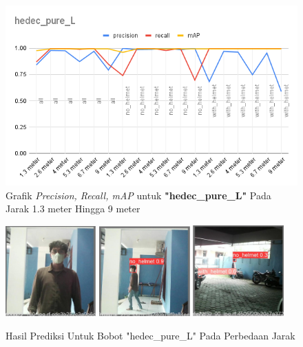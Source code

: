 \begin{enumerate}
  \newpage
  \begin{figure} [h!]
    \centering
    \includegraphics[width=1\textwidth]{gambar/BerdasarkanJarak/hedec_pure_L.png}
    \caption{Grafik \emph{Precision, Recall, mAP} untuk \textbf{"hedec\_pure\_L"} Pada Jarak 1.3 meter Hingga 9 meter}
    \label{fig:grafvaljarak_hedec_pure_L}  
  \end{figure}

  \begin{figure} [h!]
    \centering
    \includegraphics[width=0.31\textwidth]{gambar/BerdasarkanJarak_v2/val_hedec_pure_L/Jarak1_3/val_batch0_pred.jpg}
    \includegraphics[width=0.31\textwidth]{gambar/BerdasarkanJarak_v2/val_hedec_pure_L/Jarak5_3/val_batch0_pred.jpg}
    \includegraphics[width=0.31\textwidth]{gambar/BerdasarkanJarak_v2/val_hedec_pure_L/Jarak9/val_batch0_pred.jpg}
    \caption{Hasil Prediksi Untuk Bobot "hedec\_pure\_L" Pada Perbedaan Jarak}
    \label{fig:valjarak_sample_hedec_pure_L}  
  \end{figure}



\end{enumerate}



